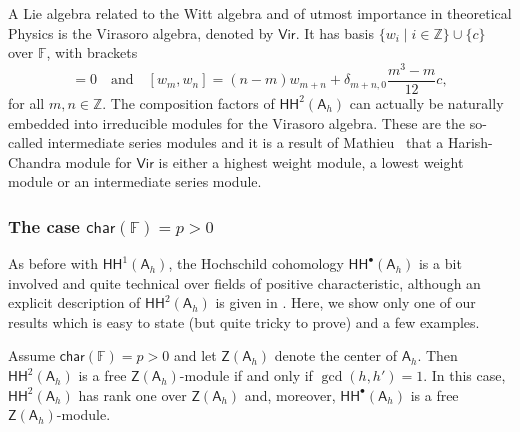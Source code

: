 \documentclass{commat}
\newcommand{\FF}{\mathbb{F}}
\newcommand{\ZZ}{\mathbb{Z}}
\newcommand{\A}{\mathsf{A}}
\newcommand\chara{\mathsf {char}}
\newcommand\hoch{\mathsf{HH}}
\newcommand{\lb}[1]{\left[ #1\right]}
\begin{document}
\begin{remark}\label{R:virasoro}
	A Lie algebra related to the Witt algebra and of utmost importance in theoretical Physics is the Virasoro algebra, denoted by $\mathsf{Vir}$. It has basis $\{w_i \mid i \in\ZZ\}\cup\{ c \}$ over $\FF$, with brackets
	\begin{equation*}
		[c, \mathsf{Vir}]=0 \quad\mbox{and}\quad  \lb{w_m, w_n}=(n-m)w_{m+n}+\delta_{m+n, 0}\frac{m^3-m}{12}c,
	\end{equation*}
	for all $m, n\in\ZZ$. The composition factors of $\hoch^2(\A_h)$ can actually be naturally embedded into irreducible modules for the Virasoro algebra. These are the so-called intermediate series modules and it is a result of Mathieu~\cite{oM92} that a Harish-Chandra module for $\mathsf{Vir}$ is either a highest weight module, a lowest weight module or an intermediate series module. 
\end{remark}


\subsubsection{The case \texorpdfstring{$\chara(\FF)=p>0$}{char(F)=p>0}}\label{SSS:hh:gerst:charp}

As before with $\hoch^1(\A_h)$, the Hochschild cohomology $\hoch^\bullet(\A_h)$ is a bit involved and quite technical over fields of positive characteristic, although an explicit description of $\hoch^2(\A_h)$ is given in \cite[Thm. 3.21]{LS21}. Here, we show only one of our results which is easy to state (but quite tricky to prove) and a few examples.

\begin{theorem}[{\cite[Thm. 3.24]{LS21}}]
	Assume  $\chara(\FF)=p>0$ and let $\mathsf{Z}(\A_h)$ denote the center of $\A_h$. Then $\hoch^2(\A_h)$ is a free $\mathsf{Z}(\A_h)$-module if and only if $\gcd(h, h')=1$. In this case, $\hoch^2(\A_h)$ has rank one over $\mathsf{Z}(\A_h)$ and, moreover, $\hoch^\bullet(\A_h)$ is a free $\mathsf{Z}(\A_h)$-module.
\end{theorem}
\end{document}
